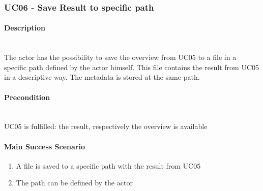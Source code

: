 \subsubsection{UC06 - Save Result to specific path}\label{UC06}
\begin{tcolorbox}
    \paragraph{Description} \ \\
    The actor has the possibility to save the overview from UC05 to a file in a specific path defined by the actor himself. This file contains the result from UC05 in a descriptive way. The metadata is stored at the same path.
    \ \\
    \paragraph{Precondition} \ \\
    UC05 is fulfilled: the result, respectively the overview is available
    \ \\
    \paragraph{Main Success Scenario} 
    \begin{enumerate}
        \item A file is saved to a specific path with the result from UC05
        \item The path can be defined by the actor
    \end{enumerate}   
\end{tcolorbox}

